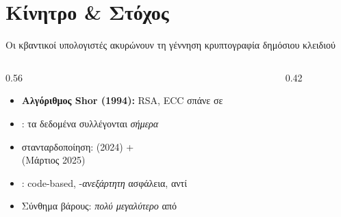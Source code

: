 \section{Κίνητρο \& Στόχος}

\begin{frame}{Οι κβαντικοί υπολογιστές ακυρώνουν τη γέννηση κρυπτογραφία δημόσιου κλειδιού}
  \begin{columns}[T]
    \begin{column}{0.56\textwidth}
      \begin{itemize}
        \item \textbf{Αλγόριθμος Shor (1994):} RSA, ECC σπάνε σε 
        \item {}: τα δεδομένα συλλέγονται \emph{σήμερα}
        \item \textbf{} στανταρδοποίηση:  (2024) +\\
               (Μάρτιος 2025)
        \item \HQC: code-based, -\emph{ανεξάρτητη} ασφάλεια,  αντί 
        \item Σύνθημα βάρους:  \emph{πολύ μεγαλύτερο} από 
      \end{itemize}
    \end{column}
    \begin{column}{0.42\textwidth}
      \centering
      \resizebox{\columnwidth}{!}{%
      }
    \end{column}
  \end{columns}
\end{frame}

